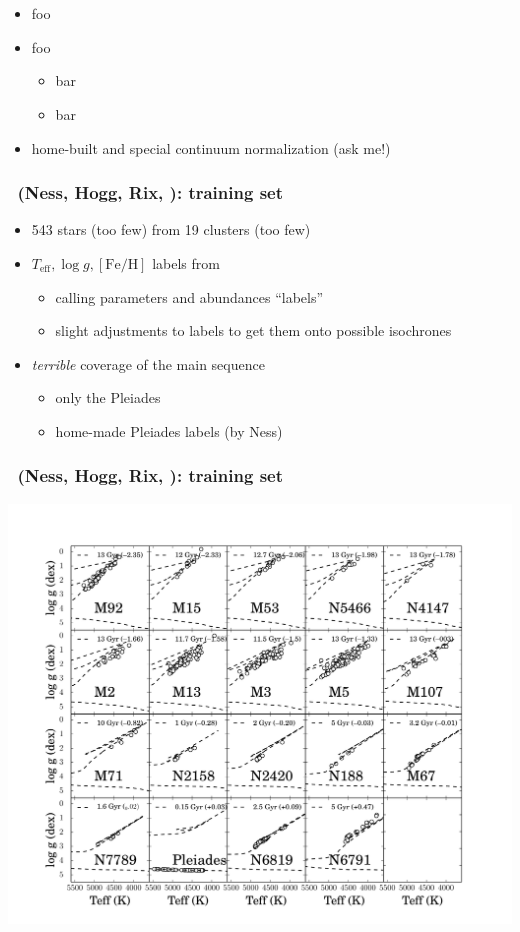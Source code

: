 \documentclass[pdftex]{beamer}
\newcommand{\credits}{{\footnotesize (Ness, Hogg, Rix, \etal)}}
\newcommand{\teff}{T_{\mathrm{eff}}}
\newcommand{\logg}{\log g}
\newcommand{\feh}{[\mathrm{Fe / H}]}
\begin{document}
\begin{frame}
  \frametitle{\sdssiii\ \apogee}
  \begin{itemize}
  \item foo
  \item foo
    \begin{itemize}
    \item bar
    \item bar
    \end{itemize}
  \item home-built and special continuum normalization (ask me!)
  \end{itemize}
\end{frame}

\begin{frame}
  \frametitle{\tc\ \credits: training set}
  \begin{itemize}
  \item 543 stars (too few) from 19 clusters (too few)
  \item $\teff, \logg, \feh$ labels from \apogee
    \begin{itemize}
    \item calling parameters and abundances ``labels''
    \item slight adjustments to labels to get them onto possible isochrones
    \end{itemize}
  \item \emph{terrible} coverage of the main sequence
    \begin{itemize}
    \item only the Pleiades
    \item home-made Pleiades labels (by Ness)
    \end{itemize}
  \end{itemize}
\end{frame}

\begin{frame}
  \frametitle{\tc\ \credits: training set}
  \includegraphics[height=0.9\textheight]{../documents/plots/training_aspcap2.pdf}
\end{frame}
\end{document}
